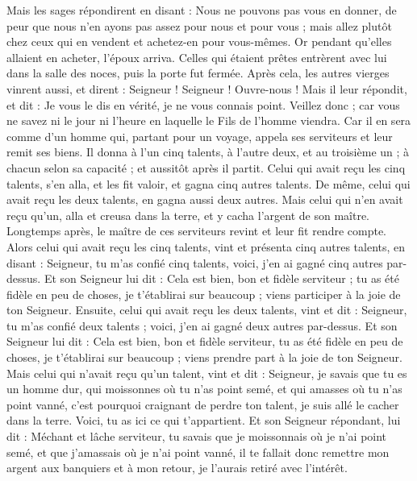 \begin{multicols}{2}
Mais les sages répondirent en disant : Nous ne pouvons pas vous en donner, de peur que nous n'en ayons pas assez pour nous et pour vous ; mais allez plutôt chez ceux qui en vendent et achetez-en pour vous-mêmes.
Or pendant qu'elles allaient en acheter, l'époux arriva. Celles qui étaient prêtes entrèrent avec lui dans la salle des noces, puis la porte fut fermée.
Après cela, les autres vierges vinrent aussi, et dirent : Seigneur ! Seigneur ! Ouvre-nous !
Mais il leur répondit, et dit : Je vous le dis en vérité, je ne vous connais point.
Veillez donc ; car vous ne savez ni le jour ni l'heure en laquelle le Fils de l'homme viendra.
Car il en sera comme d'un homme qui, partant pour un voyage, appela ses serviteurs et leur remit ses biens.
Il donna à l'un cinq talents, à l'autre deux, et au troisième un ; à chacun selon sa capacité ; et aussitôt après il partit.
Celui qui avait reçu les cinq talents, s'en alla, et les fit valoir, et gagna cinq autres talents.
De même, celui qui avait reçu les deux talents, en gagna aussi deux autres.
Mais celui qui n'en avait reçu qu'un, alla et creusa dans la terre, et y cacha l'argent de son maître.
Longtemps après, le maître de ces serviteurs revint et leur fit rendre compte.
Alors celui qui avait reçu les cinq talents, vint et présenta cinq autres talents, en disant : Seigneur, tu m'as confié cinq talents, voici, j'en ai gagné cinq autres par-dessus.
Et son Seigneur lui dit : Cela est bien, bon et fidèle serviteur ; tu as été fidèle en peu de choses, je t'établirai sur beaucoup ; viens participer à la joie de ton Seigneur.
Ensuite, celui qui avait reçu les deux talents, vint et dit : Seigneur, tu m'as confié deux talents ; voici, j'en ai gagné deux autres par-dessus.
Et son Seigneur lui dit : Cela est bien, bon et fidèle serviteur, tu as été fidèle en peu de choses, je t'établirai sur beaucoup ; viens prendre part à la joie de ton Seigneur.
Mais celui qui n'avait reçu qu'un talent, vint et dit : Seigneur, je savais que tu es un homme dur, qui moissonnes où tu n'as point semé, et qui amasses où tu n'as point vanné,
c'est pourquoi craignant de perdre ton talent, je suis allé le cacher dans la terre. Voici, tu as ici ce qui t'appartient.
Et son Seigneur répondant, lui dit : Méchant et lâche serviteur, tu savais que je moissonnais où je n'ai point semé, et que j'amassais où je n'ai point vanné,
il te fallait donc remettre mon argent aux banquiers et à mon retour, je l'aurais retiré avec l'intérêt.

\end{multicols}
